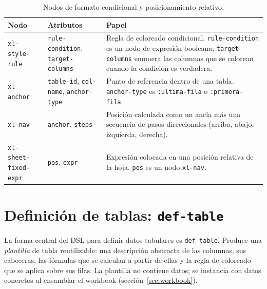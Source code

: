 \begin{table}[h!]
\centering
\caption{Nodos de formato condicional y posicionamiento relativo.}
\label{tab:ast-formato}
\renewcommand{\arraystretch}{1.3}
\begin{tabular}{p{3.6cm} p{4.8cm} p{5.4cm}}
\toprule
\textbf{Nodo} & \textbf{Atributos} & \textbf{Papel} \\
\midrule
\texttt{xl-style-rule}
  & \texttt{rule-condition},\newline
    \texttt{target-columns}
  & Regla de coloreado condicional.  \texttt{rule-condition}
    es un nodo de expresi\'on booleana; \texttt{target-columns}
    enumera las columnas que se colorean cuando la condici\'on
    es verdadera. \\
\midrule
\texttt{xl-anchor}
  & \texttt{table-id},\newline
    \texttt{col-name},\newline
    \texttt{anchor-type}
  & Punto de referencia dentro de una tabla.
    \texttt{anchor-type} es \texttt{:ultima-fila} o
    \texttt{:primera-fila}. \\
\midrule
\texttt{xl-nav}
  & \texttt{anchor}, \texttt{steps}
  & Posici\'on calculada como un ancla m\'as una secuencia de
    pasos direccionales (arriba, abajo, izquierda, derecha). \\
\midrule
\texttt{xl-sheet-fixed-expr}
  & \texttt{pos}, \texttt{expr}
  & Expresi\'on colocada en una posici\'on relativa de la hoja.
    \texttt{pos} es un nodo \texttt{xl-nav}. \\
\bottomrule
\end{tabular}
\end{table}

\section{Definici\'on de tablas: \texttt{def-table}}
\label{sec:def-table}

La forma central del DSL para definir datos tabulares es \texttt{def-table}.
Produce una \emph{plantilla} de tabla reutilizable: una descripci\'on
abstracta de las columnas, sus cabeceras, las f\'ormulas que se calculan a
partir de ellas y la regla de coloreado que se aplica sobre sus filas.  La
plantilla no contiene datos; se instancia con datos concretos al ensamblar
el workbook (secci\'on~\ref{sec:workbook}).

